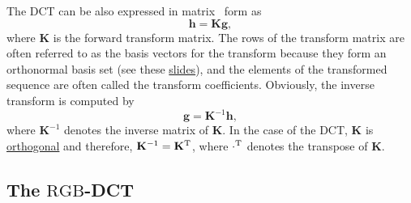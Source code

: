 The DCT can be also expressed in matrix~\cite{sayood2017introduction}
form as
\begin{equation}
  {\mathbf h} = {\mathbf K}{\mathbf g},
\end{equation}
where ${\mathbf K}$ is the forward transform matrix. The rows of the
transform matrix are often referred to as the basis vectors for the
transform because they form an orthonormal basis set (see these
\href{https://cseweb.ucsd.edu/classes/fa17/cse166-a/lec13.pdf}{slides}),
and the elements of the transformed sequence are often called the
transform coefficients. Obviously, the inverse transform is computed
by
\begin{equation}
  {\mathbf g} = {\mathbf K}^{-1}{\mathbf h},
\end{equation}
where ${\mathbf K}^{-1}$ denotes the inverse matrix of ${\mathbf
  K}$. In the case of the DCT, ${\mathbf K}$ is
\href{https://en.wikipedia.org/wiki/Orthogonal_matrix}{orthogonal} and
therefore, ${\mathbf K}^{-1}={\mathbf K}^{\text T}$, where
$\cdot^{\text T}$ denotes the transpose of ${\mathbf K}$.


\subsection{The $\text{RGB}$-DCT}

